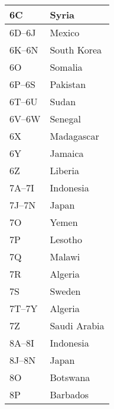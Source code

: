 \begin{longtable}{|l|l|}
  6C                  & Syria                                     \\
  \hline
  6D--6J              & Mexico                                    \\
  \hline
  6K--6N              & South Korea                               \\
  \hline
  6O                  & Somalia                                   \\
  \hline
  6P--6S              & Pakistan                                  \\
  \hline
  6T--6U              & Sudan                                     \\
  \hline
  6V--6W              & Senegal                                   \\
  \hline
  6X                  & Madagascar                                \\
  \hline
  6Y                  & Jamaica                                   \\
  \hline
  6Z                  & Liberia                                   \\
  \hline
  7A--7I              & Indonesia                                 \\
  \hline
  7J--7N              & Japan                                     \\
  \hline
  7O                  & Yemen                                     \\
  \hline
  7P                  & Lesotho                                   \\
  \hline
  7Q                  & Malawi                                    \\
  \hline
  7R                  & Algeria                                   \\
  \hline
  7S                  & Sweden                                    \\
  \hline
  7T--7Y              & Algeria                                   \\
  \hline
  7Z                  & Saudi Arabia                              \\
  \hline
  8A--8I              & Indonesia                                 \\
  \hline
  8J--8N              & Japan                                     \\
  \hline
  8O                  & Botswana                                  \\
  \hline
  8P                  & Barbados                                  \\

\end{longtable}
